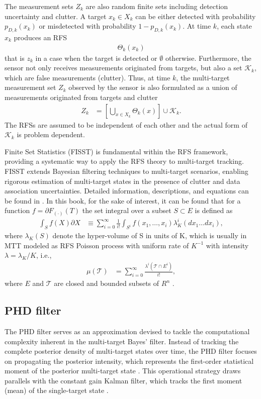 The measurement sets $Z_k$ are also random finite sets including detection uncertainty and clutter. A target $x_k \in X_k$ can be either detected with probability $p_{D,k}(x_k)$ or misdetected with probability $1-p_{D,k}(x_k)$. At time $k$, each state $x_k$ produces an RFS
\begin{align}
    \Theta_k(x_k)
\end{align}
that is ${z_k}$ in a case when the target is detected or $\emptyset$ otherwise. Furthermore, the sensor not only
receives measurements originated from targets, but also a set $\mathcal{K}_k$, which are false measurements (clutter). Thus, at
time $k$, the multi-target measurement set $Z_k$ observed by the sensor is also formulated as a union of measurements
originated from targets and clutter
\begin{align}
    Z_k &= \left[ \bigcup_{x \in X_k} \Theta_k(x) \right] \cup \mathcal{K}_k. \label{eq:rfs_measurement_union}
\end{align}
The RFSs are assumed to be independent of each other and the actual form of $\mathcal{K}_k$ is problem dependent.


Finite Set Statistics (FISST) is fundamental within the RFS framework, providing a systematic way to apply the RFS theory
to multi-target tracking. FISST extends Bayesian filtering techniques to multi-target scenarios, enabling rigorous
estimation of multi-target states in the presence of clutter and data association uncertainties. Detailed information, descriptions, and equations can be found in \cite{FISSTgoodman1997}. In this book, for the sake of interest, it can be found that for a function $f=\partial F_{(\cdot)}(T)$ the set integral over a subset $S \subset E$ is
defined as
\begin{align}
    \int_{S}f(X)\partial X &\equiv \sum_{i=0}^{\infty} \frac{1}{i!}\int_{S^i} f({x_1,\dots,x_i})\lambda_K^i(dx_1\dots dx_i),
\end{align}
where $\lambda_K(S)$ denote the hyper-volume of S in units of K, which is usually in MTT modeled as RFS Poisson process with uniform rate of $K^{-1}$ with intensity $\lambda = \lambda_K/K$, i.e.,
\begin{align}
    \mu(\mathcal{T}) &= \sum_{i=0}^{\infty} \frac{\lambda^i(\mathcal{T} \cap E^i)}{i!},
\end{align}
where $E$ and $\mathcal{T}$ are closed and bounded subsets of $R^n$ \cite{VoRFS2003}.

        \subsection{PHD filter}
\label{sec:phdfilter}
The PHD filter serves as an approximation devised to tackle the computational complexity inherent in the multi-target Bayes' filter. Instead of tracking the complete posterior density of multi-target states over time, the PHD filter focuses on propagating the posterior intensity, which represents the first-order statistical moment of the posterior multi-target state \cite{mahler}. This operational strategy draws parallels with the constant gain Kalman filter, which tracks the first moment (mean) of the single-target state \cite{VoMaPHD2006}.

